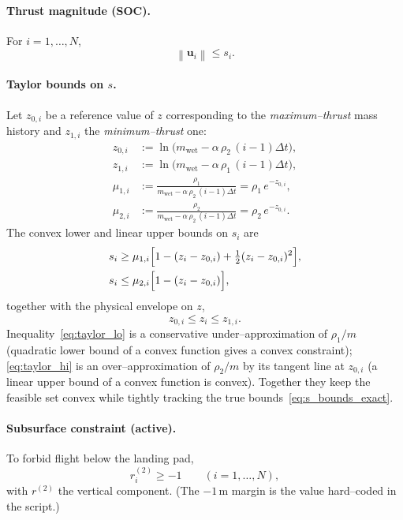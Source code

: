 \documentclass[11pt]{article}
\newcommand{\norm}[1]{\left\|#1\right\|}
\newcommand{\bv}[1]{\bm{#1}}
\begin{document}
\paragraph{Thrust magnitude (SOC).}
For $i=1,\dots,N$,
\begin{equation}
\norm{\bv u_i} \le s_i .
\label{eq:disc_soc}
\end{equation}

\paragraph{Taylor bounds on $s$.}
Let $z_{0,i}$ be a reference value of $z$ corresponding to the
\emph{maximum--thrust} mass history and $z_{1,i}$ the
\emph{minimum--thrust} one:
\begin{align}
z_{0,i} &:= \ln\!\bigl(m_{\text{wet}}-\alpha\,\rho_2\,(i-1)\Delta t\bigr),
\\
z_{1,i} &:= \ln\!\bigl(m_{\text{wet}}-\alpha\,\rho_1\,(i-1)\Delta t\bigr),
\\
\mu_{1,i} &:= \frac{\rho_1}{m_{\text{wet}}-\alpha\,\rho_2\,(i-1)\Delta t}
           = \rho_1\,e^{-z_{0,i}},
\\
\mu_{2,i} &:= \frac{\rho_2}{m_{\text{wet}}-\alpha\,\rho_2\,(i-1)\Delta t}
           = \rho_2\,e^{-z_{0,i}} .
\end{align}
The convex lower and linear upper bounds on $s_i$ are
\begin{align}
s_i &\ge \mu_{1,i}\Bigl[1-(z_i-z_{0,i})+\tfrac{1}{2}(z_i-z_{0,i})^2\Bigr],
\label{eq:taylor_lo}\\
s_i &\le \mu_{2,i}\Bigl[1-(z_i-z_{0,i})\Bigr],
\label{eq:taylor_hi}
\end{align}
together with the physical envelope on $z$,
\begin{equation}
z_{0,i}\le z_i \le z_{1,i} .
\label{eq:z_env}
\end{equation}
Inequality~\eqref{eq:taylor_lo} is a conservative under--approximation
of $\rho_1/m$ (quadratic lower bound of a convex function gives a
convex constraint); \eqref{eq:taylor_hi} is an over--approximation of
$\rho_2/m$ by its tangent line at $z_{0,i}$ (a linear upper bound of
a convex function is convex).  Together they keep the feasible set
convex while tightly tracking the true bounds~\eqref{eq:s_bounds_exact}.

\paragraph{Subsurface constraint (active).}
To forbid flight below the landing pad,
\begin{equation}
r_i^{(2)} \ge -1 \qquad (i=1,\dots,N),
\label{eq:subsurface}
\end{equation}
with $r^{(2)}$ the vertical component.  (The $-1$\,m margin is the
value hard--coded in the script.)
\end{document}
